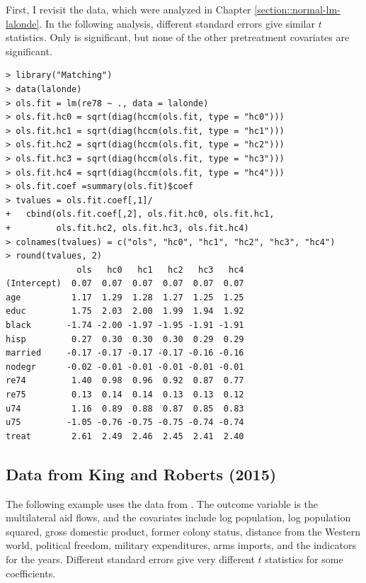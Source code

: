 First, I revisit the  data, which were analyzed in Chapter \ref{section::normal-lm-lalonde}. In the following analysis,  different standard errors give similar $t$ statistics. Only  is significant, but none of the other pretreatment covariates are significant. 



\begin{lstlisting}
> library("Matching")
> data(lalonde)
> ols.fit = lm(re78 ~ ., data = lalonde)
> ols.fit.hc0 = sqrt(diag(hccm(ols.fit, type = "hc0")))
> ols.fit.hc1 = sqrt(diag(hccm(ols.fit, type = "hc1")))
> ols.fit.hc2 = sqrt(diag(hccm(ols.fit, type = "hc2")))
> ols.fit.hc3 = sqrt(diag(hccm(ols.fit, type = "hc3")))
> ols.fit.hc4 = sqrt(diag(hccm(ols.fit, type = "hc4")))
> ols.fit.coef =summary(ols.fit)$coef
> tvalues = ols.fit.coef[,1]/
+   cbind(ols.fit.coef[,2], ols.fit.hc0, ols.fit.hc1, 
+         ols.fit.hc2, ols.fit.hc3, ols.fit.hc4)
> colnames(tvalues) = c("ols", "hc0", "hc1", "hc2", "hc3", "hc4")
> round(tvalues, 2)
              ols   hc0   hc1   hc2   hc3   hc4
(Intercept)  0.07  0.07  0.07  0.07  0.07  0.07
age          1.17  1.29  1.28  1.27  1.25  1.25
educ         1.75  2.03  2.00  1.99  1.94  1.92
black       -1.74 -2.00 -1.97 -1.95 -1.91 -1.91
hisp         0.27  0.30  0.30  0.30  0.29  0.29
married     -0.17 -0.17 -0.17 -0.17 -0.16 -0.16
nodegr      -0.02 -0.01 -0.01 -0.01 -0.01 -0.01
re74         1.40  0.98  0.96  0.92  0.87  0.77
re75         0.13  0.14  0.14  0.13  0.13  0.12
u74          1.16  0.89  0.88  0.87  0.85  0.83
u75         -1.05 -0.76 -0.75 -0.75 -0.74 -0.74
treat        2.61  2.49  2.46  2.45  2.41  2.40
\end{lstlisting}


\subsection{Data from King and Roberts (2015)}
\label{sec::example-ehw-kingdata1}



The following example uses the data from \citet{king2015robust}. The outcome variable is the multilateral aid flows, and the covariates include log population, log population squared, gross domestic product, former colony status, distance from the Western world, political freedom, military expenditures, arms imports, and the indicators for the years. Different standard errors give very different $t$ statistics for some coefficients. 
 

